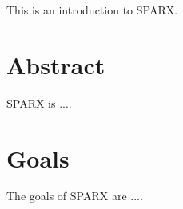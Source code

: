 This is an introduction to SPARX.

\section{Abstract}

SPARX is ....

\section{Goals}
The goals of SPARX are ....
